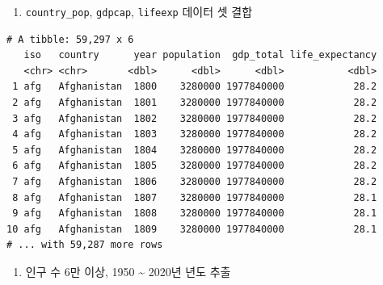 \documentclass[
  11pt,
]{krantz}
\newenvironment{Shaded}{\begin{snugshade}}{\end{snugshade}}
\newcommand{\DataTypeTok}[1]{\textcolor[rgb]{0.27,0.27,0.27}{#1}}
\newcommand{\KeywordTok}[1]{\textcolor[rgb]{0.27,0.27,0.27}{\textbf{#1}}}
\newcommand{\NormalTok}[1]{#1}
\newcommand{\OperatorTok}[1]{\textcolor[rgb]{0.43,0.43,0.43}{\textbf{#1}}}
\newcommand{\StringTok}[1]{\textcolor[rgb]{0.5,0.5,0.5}{#1}}
\providecommand{\tightlist}{%
  \setlength{\itemsep}{0pt}\setlength{\parskip}{0pt}}
\begin{document}
\normalsize

\begin{enumerate}
\def\labelenumi{\arabic{enumi}.}
\setcounter{enumi}{1}
\tightlist
\item
  \texttt{country\_pop}, \texttt{gdpcap}, \texttt{lifeexp} 데이터 셋 결합
\end{enumerate}

\footnotesize

\begin{Shaded}
\end{Shaded}

\begin{verbatim}
# A tibble: 59,297 x 6
   iso   country      year population  gdp_total life_expectancy
   <chr> <chr>       <dbl>      <dbl>      <dbl>           <dbl>
 1 afg   Afghanistan  1800    3280000 1977840000            28.2
 2 afg   Afghanistan  1801    3280000 1977840000            28.2
 3 afg   Afghanistan  1802    3280000 1977840000            28.2
 4 afg   Afghanistan  1803    3280000 1977840000            28.2
 5 afg   Afghanistan  1804    3280000 1977840000            28.2
 6 afg   Afghanistan  1805    3280000 1977840000            28.2
 7 afg   Afghanistan  1806    3280000 1977840000            28.2
 8 afg   Afghanistan  1807    3280000 1977840000            28.1
 9 afg   Afghanistan  1808    3280000 1977840000            28.1
10 afg   Afghanistan  1809    3280000 1977840000            28.1
# ... with 59,287 more rows
\end{verbatim}

\normalsize

\begin{enumerate}
\def\labelenumi{\arabic{enumi}.}
\setcounter{enumi}{2}
\tightlist
\item
  인구 수 6만 이상, 1950 \textasciitilde{} 2020년 년도 추출
\end{enumerate}
\end{document}
